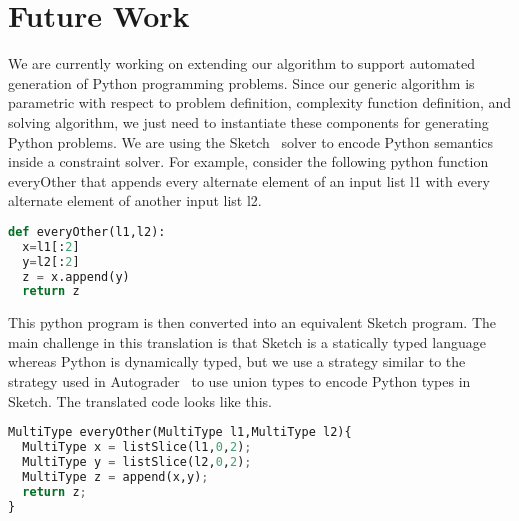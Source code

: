 \section{Future Work}

We are currently working on extending our algorithm to support
automated generation of Python programming problems. Since our generic
algorithm is parametric with respect to problem definition, complexity
function definition, and solving algorithm, we just need to
instantiate these components for generating Python problems. We are
using the Sketch~\cite{sketchjournal,sketch06} solver to encode Python
semantics inside a constraint solver. For example, consider the
following python function everyOther that appends every alternate
element of an input list l1 with every alternate element of another
input list l2.

\singlespace
\begin{lstlisting}[language=Python, frame=single]
def everyOther(l1,l2):
  x=l1[:2]
  y=l2[:2]
  z = x.append(y)
  return z

\end{lstlisting}




\doublespace

This python program is then converted into an equivalent Sketch program. The main challenge in this translation is that Sketch is a statically typed language whereas Python is dynamically typed, but we use a strategy similar to the strategy used in Autograder~\cite{autograder} to use union types to encode Python types in Sketch. The translated code looks like this.

\singlespace
\begin{lstlisting}[language=Python, frame=single]
MultiType everyOther(MultiType l1,MultiType l2){
  MultiType x = listSlice(l1,0,2);
  MultiType y = listSlice(l2,0,2);
  MultiType z = append(x,y);
  return z;
}
\end{lstlisting}
\doublespace

